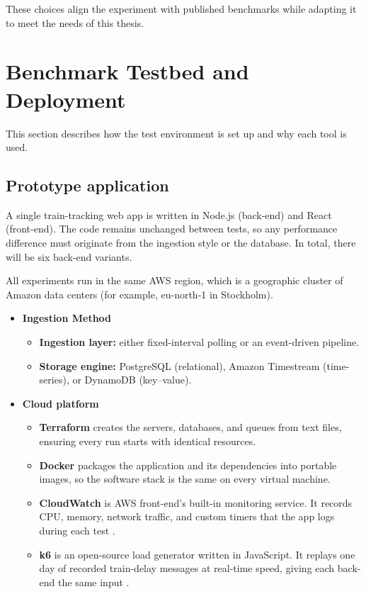 \documentclass[nomenclature, english, biblatex]{kththesis}
\numberwithin{listing}{chapter}
\begin{document}
\noindent
These choices align the experiment with published benchmarks while adapting it to meet the needs of this thesis.


\section{Benchmark Testbed and Deployment}
\label{sec:testbed}
This section describes how the test environment is set up and why each tool is used.

\subsection{Prototype application}
A single train-tracking web app is written in Node.js (back-end) and React (front-end). The code remains unchanged between tests, so any performance difference must originate from the ingestion style or the database. In total, there will be six back-end variants.

All experiments run in the same AWS region, which is a geographic cluster of Amazon data centers (for example, eu-north-1 in Stockholm).

\begin{itemize}[leftmargin=*]
  \item[] \textbf{Ingestion Method}
  \begin{itemize}[leftmargin=*]
      \item \textbf{Ingestion layer:} either fixed-interval polling or an event-driven pipeline.
      \item \textbf{Storage engine:} PostgreSQL (relational), Amazon Timestream (time-series), or DynamoDB (key–value).
  \end{itemize}
  \item[] \textbf{Cloud platform}
  \begin{itemize}[leftmargin=*]
      \item \textbf{Terraform} creates the servers, databases, and queues from text files, ensuring every run starts with identical resources.
      \item \textbf{Docker} packages the application and its dependencies into portable images, so the software stack is the same on every virtual machine.
      \item \textbf{CloudWatch} is \gls{AWS} front-end's built-in monitoring service. It records CPU, memory, network traffic, and custom timers that the app logs during each test \cite{AWSCloudWatch2025}.
      \item \textbf{k6} is an open-source load generator written in JavaScript. It replays one day of recorded train-delay messages at real-time speed, giving each back-end the same input \cite{k6Docs2025}.
  \end{itemize}
\end{itemize}
\end{document}
